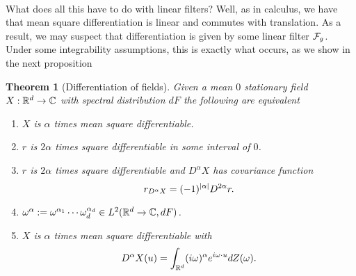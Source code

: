 \documentclass[12pt]{article}
\newtheorem{theorem}{Theorem}
\begin{document}
\\
What does all this have to do with linear filters? Well, as in calculus, we have that mean square differentiation is linear and commutes with translation. As a result, we may suspect that differentiation is given by some linear filter $\mathcal{F}_g$. Under some integrability assumptions, this is exactly what occurs, as we show in the next proposition
\begin{theorem}[Differentiation of fields]\label{diff fields theorem}
    Given a mean $0$ stationary  field $X:{\mathbb R}^d\to\mathbb{C}$ with spectral distribution $dF$ the following are equivalent
    \begin{enumerate}
        \item $X$ is $\alpha$ times mean square differentiable.
        \item $r$ is $2\alpha$ times square differentiable in some interval of $0$.
        \item $r$ is $2\alpha$ times square differentiable and $D^\alpha X$ has covariance function
              \begin{equation*}
                  r_{D^\alpha X}=(-1)^{\abs{\alpha}}D^{2\alpha}r.
              \end{equation*}
        \item $\omega^\alpha:=\omega^{\alpha_1}\cdots \omega_d^{\alpha_d}\in L^2({\mathbb R}^d\to\mathbb{C},dF)$.
        \item $X$ is $\alpha$ times mean square differentiable with
              \begin{equation}\label{deriv X equation}
                  D^\alpha X(u)=\int_{{\mathbb R}^d}(i\omega)^{\alpha}e^{i\omega\cdot u}dZ(\omega).
              \end{equation}
    \end{enumerate}
\end{theorem}
\end{document}
